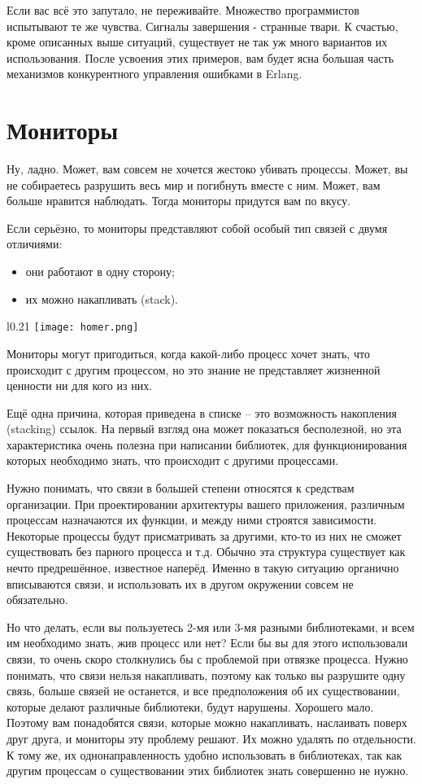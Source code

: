 Если вас всё это запутало, не переживайте.
Множество программистов испытывают те же чувства.
Сигналы завершения \-- странные твари.
К счастью, кроме описанных выше ситуаций, существует не так уж много вариантов их использования.
После усвоения этих примеров, вам будет ясна большая часть механизмов конкурентного управления ошибками в Erlang.
\section{Мониторы}
\label{monitors}
Ну, ладно.
Может, вам совсем не хочется жестоко убивать процессы.
Может, вы не собираетесь разрушить весь мир и погибнуть вместе с ним.
Может, вам больше нравится наблюдать.
Тогда мониторы придутся вам по вкусу.

Если серьёзно, то мониторы представляют собой особый тип связей с двумя отличиями:
\begin{itemize}
    \item они работают в одну сторону;
    \item их можно накапливать (stack).
\end{itemize}

\begin{wrapfigure}{l}{0.21\linewidth}
    \texttt{[image: homer.png]}
\end{wrapfigure}

Мониторы могут пригодиться, когда какой\--либо процесс хочет знать, что происходит с другим  процессом, но это знание не представляет жизненной ценности ни для кого из них.

Ещё одна причина, которая приведена в списке \--- это возможность накопления (stacking) ссылок.
На первый взгляд она может показаться бесполезной, но эта характеристика очень полезна при написании библиотек, для функционирования которых необходимо знать, что происходит с другими процессами.

Нужно понимать, что связи в большей степени относятся к средствам организации.
При проектировании архитектуры вашего приложения, различным процессам назначаются их функции, и между ними строятся зависимости.
Некоторые процессы будут присматривать за другими, кто\--то из них не сможет существовать без парного процесса и т.д.
Обычно эта структура существует как нечто предрешённое, известное наперёд.
Именно в такую ситуацию органично вписываются связи, и использовать их в другом окружении совсем не обязательно.

Но что делать, если вы пользуетесь 2\--мя или 3\--мя разными библиотеками, и всем им необходимо знать, жив процесс или нет?
Если бы вы для этого использовали связи, то очень скоро столкнулись бы с проблемой при отвязке процесса.
Нужно понимать, что связи нельзя накапливать, поэтому как только вы разрушите одну связь, больше связей не останется, и все предположения об их существовании, которые делают различные библиотеки, будут нарушены.
Хорошего мало.
Поэтому вам понадобятся связи, которые можно накапливать, наслаивать поверх друг друга, и мониторы эту проблему решают.
Их можно удалять по отдельности.
К тому же, их однонаправленность удобно использовать в библиотеках, так как другим процессам о существовании этих библиотек знать совершенно не нужно.


